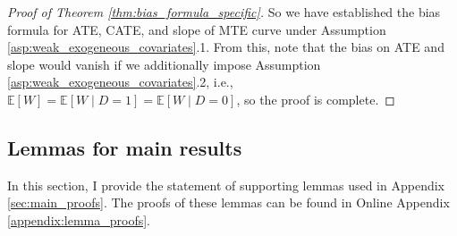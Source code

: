 \documentclass[11pt]{article}
\theoremstyle{definition}
\newcommand{\Exp}{\ensuremath{\mathbb{E}}} %
\newcommand{\0}{\ensuremath{\mathbf{0}}}
\begin{document}
\begin{bibunit}
\begin{proof}[Proof of Theorem \ref{thm:bias_formula_specific}]
So we have established the bias formula for ATE, CATE, and slope of MTE curve under Assumption \ref{asp:weak_exogeneous_covariates}.1. From this, note that the bias on ATE and slope would vanish if we additionally impose Assumption \ref{asp:weak_exogeneous_covariates}.2, i.e., $\Exp[W] = \Exp[W\mid D=1] = \Exp[W\mid D=0]$, so the proof is complete.
\end{proof}

\subsection{Lemmas for main results}
\label{sec:main_lemmas}

In this section, I provide the statement of supporting lemmas used in  Appendix \ref{sec:main_proofs}. The proofs of these lemmas can be found in Online Appendix \ref{appendix:lemma_proofs}.


\end{bibunit}
\end{document}

